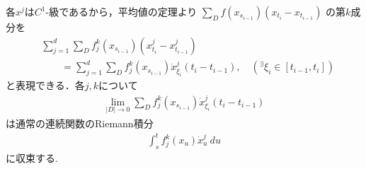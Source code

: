 	\begin{prf}
		各$x^j$は$C^1$-級であるから，平均値の定理より
		$\sum_{D} f(x_{s_{i-1}})(x_{t_i} - x_{t_{i-1}})$
		の第$k$成分を
		\begin{align}
			&\sum_{j=1}^{d} \sum_{D} f^k_j (x_{s_{i-1}})(x^j_{t_i} - x^j_{t_{i-1}}) 
				\label{eq:thm_existence_of_Riemann_Stieltjes_integral}\\
			&\qquad 
			= \sum_{j=1}^{d} \sum_{D} f^k_j (x_{s_{i-1}}) \dot{x}^j_{\xi_i}(t_i - t_{i-1}),
			\quad ({}^\exists \xi_i \in [t_{i-1},t_i])
		\end{align}
		と表現できる．各$j,k$について
		\begin{align}
			\lim_{|D| \to 0} \sum_{D} f^k_j (x_{s_{i-1}}) \dot{x}^j_{\xi_i}(t_i - t_{i-1})
		\end{align}
		は通常の連続関数のRiemann積分
		\begin{align}
			\int_s^t f^k_j (x_u) \dot{x}^j_u\ du
		\end{align}
		に収束する. 
		\begin{comment}
		が確定すれば，第$k$成分の極限が確定し定理の主張を得る．
		いま，$t \longrightarrow f^k_j(x_t)$及び$t \longmapsto (d/dt)x^j_t$は（$[s,t]$上一様）連続であるから，
		分割$D$による各区間$[t_{i-1},t_i]$において次の最大最小値が定まる:
		\begin{align}
			M_i \coloneqq \sup{t_{i-1} \leq t \leq t_i} f^k_j(x_t)\dot{x}^j_t,
			\quad m_i \coloneqq \inf{t_{i-1} \leq t \leq t_i} f^k_j(x_t)\dot{x}^j_t.
		\end{align}
		ここで
		\begin{align}
			S_D \coloneqq \sum_{D} M_i(t_i - t_{i-1}),
			\quad s_D \coloneqq \sum_{D} m_i(t_i - t_{i-1}),
			\quad \Sigma_D \coloneqq \sum_{D} f^k_j (x_{s_{i-1}}) \dot{x}^j_{\xi_i}(t_i - t_{i-1})
		\end{align}
		とおいて
		\begin{align}
			S \coloneqq \inf{D \in \delta[s,t]}{S_D},
			\quad s \coloneqq \sup{D \in \delta[s,t]}{s_D}
		\end{align}
		を定めれば
		\begin{align}
			s_D \leq s \leq S \leq S_D,
			\quad s_D \leq \Sigma_D \leq S_D
		\end{align}
		が満たされる．実際，任意の$D_1,D_2 \in \delta[s,t]$に対して，
		分割の合併を$D_3$とすれば
		\begin{align}
			s_{D_1} \leq s_{D_3} \leq S_{D_3} \leq S_{D_2}
		\end{align}
		が成立し$s \leq S_D\ (\forall D \in \delta[s,t])$すなわち$s \leq S$が出る．
		一方で一様連続性から
		\begin{align}
			0 \leq S - s \leq S_D - s_D = \sum_D (M_i - m_i)(t_i - t_{i-1})
			\longrightarrow 0
			\quad (|D| \longrightarrow 0)
		\end{align}
		が従い$s = S$を得る．以上より
		\begin{align}
			|S - \Sigma_D| \leq |S - S_D| + |S_D - \Sigma_D|
			\leq |S - S_D| + |S_D - s_D|
			\longrightarrow 0
			\quad (|D| \longrightarrow 0)
		\end{align}
		が成り立つ．
		\end{comment}
		\QED
\end{prf}

